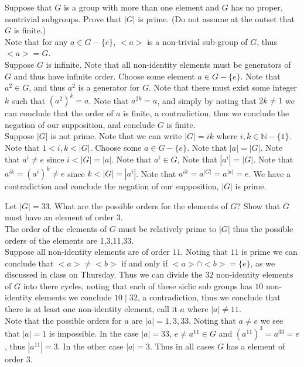 \documentclass[12pt]{article}
\makeatletter
\theoremstyle{homework}
\newenvironment{exercise}[1]
{\def\@currentlabel{#1}\exercisecore}
{\endexercisecore}
\makeatother
\begin{document}
\begin{exercise}{7.26}
Suppose that $G$ is a group with more than one element and $G$ has no proper, nontrivial subgroups. Prove that $|G|$ is prime. (Do not assume at the outset that $G$ is finite.)\\
Note that for any $a\in G-\{e\}$, $<a>$ is a non-trivial sub-group of $G$, thus $<a>=G$.\\
Suppose $G$ is infinite.  Note that all non-identity elements must be generators of $G$ and thus have infinite order.  Choose some element $a\in G-\{e\}$.  Note that $a^2\in G$, and thus $a^2$ is a generator for $G$.  Note that there must exist some integer $k$ such that $(a^2)^k=a$.  Note that $a^{2k}=a$, and simply by noting that $2k\neq 1$ we can conclude that the order of $a$ is finite, a contradiction, thus we conclude the negation of our supposition, and conclude $G$ is finite.\\
Suppose $|G|$ is not prime.  Note that we can write $|G|=ik$ where $i,k\in\mathbb{N}-\{1\}$.  Note that $1<i,k<|G|$.  Choose some $a\in G-\{e\}$.  Note that $|a|=|G|$.  Note that $a^i\neq e$ since $i<|G|=|a|$.  Note that $a^i\in G$,  Note that $|a^i|=|G|$.  Note that $a^{ik}=(a^i)^k\neq e$ since $k<|G|=|a^i|$.  Note that $a^{ik}=a^{|G|}=a^{|a|}=e$.  We have a contradiction and conclude the negation of our supposition, $|G|$ is prime.
\end{exercise}

\begin{exercise}{7.29}
Let $|G| = 33$. What are the possible orders for the elements of $G$?  Show that $G$ must have an element of order $3$.\\
The order of the elements of $G$ must be relatively prime to $|G|$ thus the possible orders of the elements are 1,3,11,33.\\
Suppose all non-identity elements are of order $11$.  Noting that $11$ is prime we can conclude that $<a>\neq <b>$ if and only if $<a>\cap <b>=\{e\}$, as we discussed in class on Thursday.  Thus we can divide the $32$ non-identity elements of $G$ into there cycles, noting that each of these siclic sub groups has $10$ non-identity elements we conclude $10\mid 32$, a contradiction, thus we conclude that there is at least one non-identity element, call it $a$ where $|a|\neq 11$.\\
Note that the possible orders for $a$ are $|a|=1,3,33$.  Noting that $a\neq e$ we see that $|a|=1$ is impossible.  In the case $|a|=33$, $e\neq a^{11}\in G$ and $(a^{11})^3=a^{33}=e$, thus $|a^{11}|=3$.  In the other case $|a|=3$.  Thus in all cases $G$ has a element of order 3. 
\end{exercise}
\end{document}
